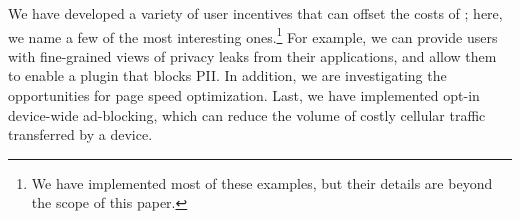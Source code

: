 We have developed a variety of user incentives that can offset the costs of 
\platname{}; here, we name a few of the most interesting ones.\footnote{We have implemented most of these examples, 
but their details are beyond the scope of this paper.} For example, 
we can provide users with fine-grained views of privacy leaks from 
their applications, and allow them to enable a \platname{} plugin that 
blocks PII. In addition, we are investigating the opportunities for page 
speed optimization. Last, we have implemented opt-in device-wide ad-blocking, 
which can reduce the volume of costly cellular traffic transferred by a device. 


%
%
%
%
%
%
